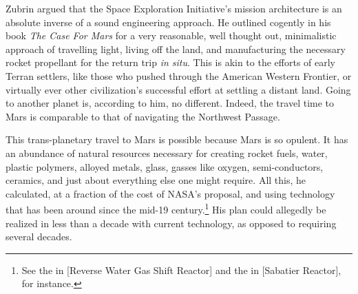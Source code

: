 Zubrin argued that the Space Exploration Initiative's mission architecture is an absolute inverse of a sound engineering approach. He outlined cogently in his book {\it The Case For Mars} for a very reasonable, well thought out, minimalistic approach of travelling light, living off the land, and manufacturing the necessary rocket propellant for the return trip {\it in situ}. This is akin to the efforts of early Terran settlers, like those who pushed through the American Western Frontier, or virtually ever other civilization's successful effort at settling a distant land. Going to another planet is, according to him, no different. Indeed, the travel time to Mars is comparable to that of navigating the Northwest Passage.

This trans-planetary travel to Mars is possible because Mars is so opulent. It has an abundance of natural resources necessary for creating rocket fuels, water, plastic polymers, alloyed metals, glass, gasses like oxygen, semi-conductors, ceramics, and just about everything else one might require. All this, he calculated, at a fraction of the cost of NASA's proposal, and using technology that has been around since the mid-19 century.\footnote{See the  in [Reverse Water Gas Shift Reactor] and the  in [Sabatier Reactor], for instance.} His plan could allegedly be realized in less than a decade with current technology, as opposed to requiring several decades.

